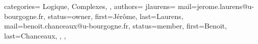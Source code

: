 {
  categories={
    Logique,
    Complexes,
  },
  authors={
    jlaurens={
      mail=jerome.laurens@u-bourgogne.fr,
      status=owner,
      first=Jérôme,
      last=Laurens,
      mail=benoit.chanceaux@u-bourgogne.fr,
      status=member,
      first=Benoit,
      last=Chanceaux,
    },
  },
}

